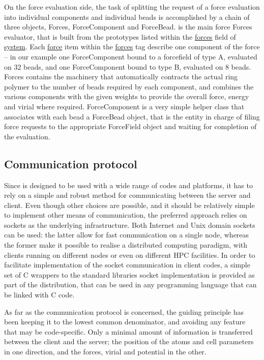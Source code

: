 \documentclass[11pt,english,fleqn]{report}
\begin{document}
On the force evaluation side, the task of splitting the request of a
force evaluation into individual components and individual beads is 
accomplished by a chain of three objects, Forces, ForceComponent and ForceBead.
is the main force Forces evaluator, that is built from the prototypes
listed within the \hyperref[FORCES]{forces} field of \hyperref[SYSTEM]{system}.
Each \hyperref[FORCECOMPONENT]{force} item within the 
\hyperref[FORCES]{forces} tag describe one component of the force --
in our example one ForceComponent bound to a forcefield of type A, 
evaluated on 32 beads, and one ForceComponent bound to type B, evaluated
on 8 beads. Forces contains the machinery that automatically contracts the
actual ring polymer to the number of beads required by each component,
and combines the various components with the given weights to provide the 
overall force, energy and virial where required. 
ForceComponent is a very simple helper class that associates with each bead 
a ForceBead object, that is the entity in charge of filing force requests to
the appropriate ForceField object and waiting for completion of the
evaluation. 

\subsection{Communication protocol}

Since \ipi is designed to be used with a wide range of codes and
platforms, it has to rely on a simple and robust method for communicating
between the server and client. Even though other choices are possible,
and it should be relatively simple to implement other means of communication,
the preferred approach relies on sockets as the underlying infrastructure.
Both Internet and Unix domain sockets can be used: the latter allow
for fast communication on a single node, whereas the former make
it possible to realise a distributed computing paradigm, with clients
running on different nodes or even on different HPC facilities. In
order to facilitate implementation of the socket communication in
client codes, a simple set of C wrappers to the standard libraries
socket implementation is provided as part of the \ipi distribution,
that can be used in any programming language that can be linked with
C code.

As far as the communication protocol is concerned, the guiding principle
has been keeping it to the lowest common denominator, and avoiding
any feature that may be code-specific. Only a minimal amount of information
is transferred between the client and the server; the position of
the atoms and cell parameters in one direction, and the forces, virial
and potential in the other.
\end{document}
